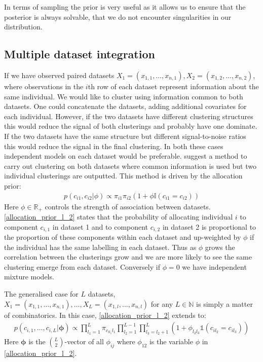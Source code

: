 \documentclass[11pt]{article} %
\begin{document}
	In terms of sampling the prior is very useful as it allows us to ensure that the posterior is always solvable, that we do not encounter singularities in our distribution.
	
	\subsection{Multiple dataset integration}
	If we have observed paired datasets $X_1 = (x_{1,1},\ldots,x_{n,1}), X_2 = (x_{1,2},\ldots,x_{n,2})$, where observations in the $i$th row of each dataset represent information about the same individual. We would like to cluster using information common to both datasets. One could concatenate the datasets, adding additional covariates for each individual. However, if the two datasets have different clustering structures this would reduce the signal of both clusterings and probably have one dominate. If the two datasets have the same structure but different signal-to-noise ratios this would reduce the signal in the final clustering. In both these cases independent models on each dataset would be preferable. \citet{kirk_bayesian_2012} suggest a method to carry out clustering on both datasets where common information is used but two individual clusterings are outputted. This method is driven by the allocation prior:
	\begin{align} \label{allocation_prior_l_2}
	p(c_{i1}, c_{i2} | \phi ) \propto \pi_{i1} \pi_{i2} (1 + \phi \mathbb{I}(c_{i1} = c_{i2}))
	\end{align}
	Here $\phi \in \mathbb{R}_+$ controls the strength of association between datasets. \eqref{allocation_prior_l_2} states that the probability of allocating individual $i$ to component $c_{i,1}$ in dataset 1 and to component $c_{i,2}$ in dataset 2 is proportional to the proportion of these components within each dataset and up-weighted by $\phi$ if the individual has the same labelling in each dataset. Thus as $\phi$ grows the correlation between the clusterings grow and we are more likely to see the same clustering emerge from each dataset. Conversely if $\phi = 0$ we have independent mixture models. 
	
	The generalised case for $L$ datasets, $X_1 = (x_{1,1},\ldots,x_{n,1}),\ldots, X_L = (x_{1,l},\ldots,x_{n,l})$ for any $L \in \mathbb{N}$ is simply a matter of combinatorics. In this case, \eqref{allocation_prior_l_2} extends to:
	\begin{align} \label{allocation_prior}
	p(c_{i,1},\ldots,c_{i,L} | \boldsymbol{\phi}) \propto \prod_{l_1=1}^L\pi_{c_{il_1}l_1}\prod_{l_2=1}^{L-1}\prod_{l_3=l_2+1}^L\left(1+\phi_{l_2l_3}\mathbb{1}(c_{il_2} = c_{il_3}) \right)
	\end{align}
	Here $\boldsymbol{\phi}$ is the ${L \choose 2}$-vector of all $\phi_{ij}$ where $\phi_{12}$ is the variable $\phi$ in \eqref{allocation_prior_l_2}.
	
\end{document}
